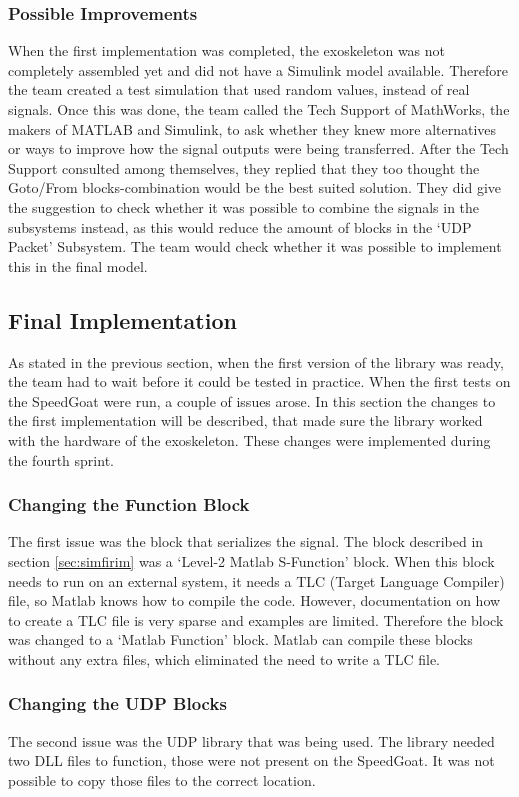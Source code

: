 \subsubsection{Possible Improvements}
When the first implementation was completed, the exoskeleton was not completely assembled yet and did not have a Simulink model available. Therefore the team created a test simulation that used random values, instead of real signals. Once this was done, the team called the Tech Support of MathWorks, the makers of MATLAB and Simulink, to ask whether they knew more alternatives or ways to improve how the signal outputs were being transferred. After the Tech Support consulted among themselves, they replied that they too thought the Goto/From blocks-combination would be the best suited solution. They did give the suggestion to check whether it was possible to combine the signals in the subsystems instead, as this would reduce the amount of blocks in the `UDP Packet' Subsystem. The team would check whether it was possible to implement this in the final model.

\subsection{Final Implementation}\label{sec:simfinim}
As stated in the previous section, when the first version of the library was ready, the team had to wait before it could be tested in practice. When the first tests on the SpeedGoat were run, a couple of issues arose. In this section the changes to the first implementation will be described, that made sure the library worked with the hardware of the exoskeleton. These changes were implemented during the fourth sprint.

\subsubsection{Changing the Function Block}
The first issue was the block that serializes the signal. The block described in section \ref{sec:simfirim} was a `Level-2 Matlab S-Function' block. When this block needs to run on an external system, it needs a TLC (Target Language Compiler) file, so Matlab knows how to compile the code. However, documentation on how to create a TLC file is very sparse and examples are limited. Therefore the block was changed to a `Matlab Function' block. Matlab can compile these blocks without any extra files, which eliminated the need to write a TLC file.

\subsubsection{Changing the UDP Blocks}
The second issue was the UDP library that was being used. The library needed two DLL files to function, those were not present on the SpeedGoat. It was not possible to copy those files to the correct location.

